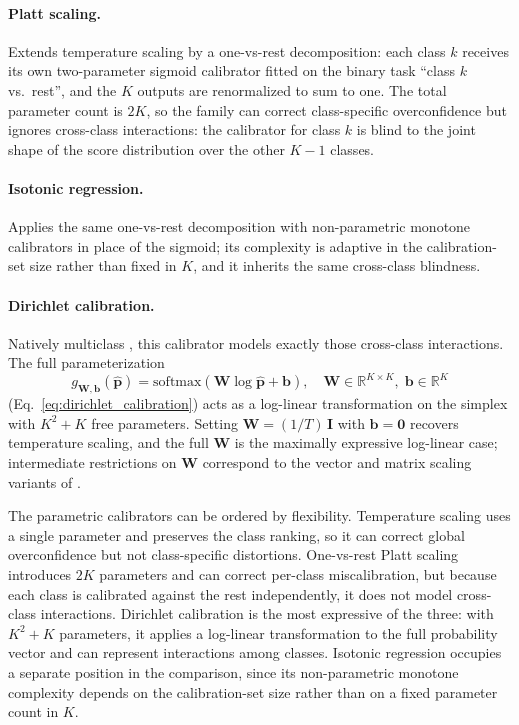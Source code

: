 \paragraph{Platt scaling.} Extends temperature scaling by a one-vs-rest decomposition: each class $k$ receives its own two-parameter sigmoid calibrator fitted on the binary task ``class $k$ vs.\ rest'', and the $K$ outputs are renormalized to sum to one. The total parameter count is $2K$, so the family can correct class-specific overconfidence but ignores cross-class interactions: the calibrator for class $k$ is blind to the joint shape of the score distribution over the other $K-1$ classes.

\paragraph{Isotonic regression.} Applies the same one-vs-rest decomposition with non-parametric monotone calibrators in place of the sigmoid; its complexity is adaptive in the calibration-set size rather than fixed in $K$, and it inherits the same cross-class blindness.

\paragraph{Dirichlet calibration.} Natively multiclass \citep{kull2019beyond}, this calibrator models exactly those cross-class interactions. The full parameterization
\[
g_{\mathbf{W},\mathbf{b}}(\hat{\mathbf{p}}) = \mathrm{softmax}(\mathbf{W} \log \hat{\mathbf{p}} + \mathbf{b}),
\quad \mathbf{W} \in \mathbb{R}^{K \times K},\; \mathbf{b} \in \mathbb{R}^K
\]
(Eq.~\ref{eq:dirichlet_calibration}) acts as a log-linear transformation on the simplex with $K^2 + K$ free parameters. Setting $\mathbf{W} = (1/T)\,\mathbf{I}$ with $\mathbf{b} = \mathbf{0}$ recovers temperature scaling, and the full $\mathbf{W}$ is the maximally expressive log-linear case; intermediate restrictions on $\mathbf{W}$ correspond to the vector and matrix scaling variants of \citet{guo2017calibration}.

The parametric calibrators can be ordered by flexibility. Temperature scaling uses a single parameter and preserves the class ranking, so it can correct global overconfidence but not class-specific distortions. One-vs-rest Platt scaling introduces $2K$ parameters and can correct per-class miscalibration, but because each class is calibrated against the rest independently, it does not model cross-class interactions. Dirichlet calibration is the most expressive of the three: with $K^2+K$ parameters, it applies a log-linear transformation to the full probability vector and can represent interactions among classes. Isotonic regression occupies a separate position in the comparison, since its non-parametric monotone complexity depends on the calibration-set size rather than on a fixed parameter count in $K$.

